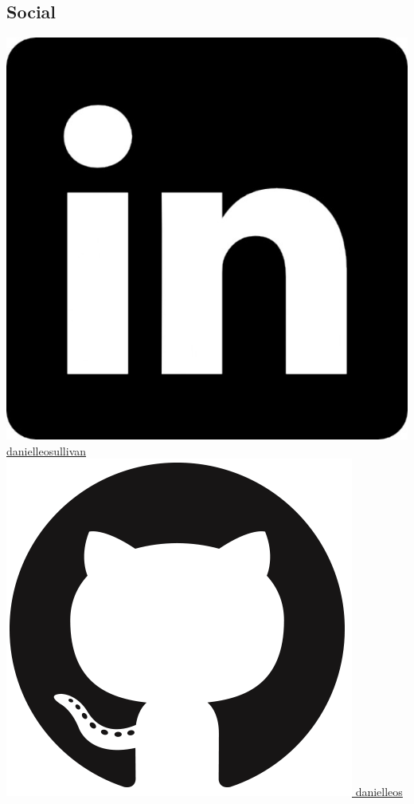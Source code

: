 \documentclass[]{friggeri-cv}
\begin{document}
\begin{aside}
  \section{Social}
    \href{https://www.linkedin.com/in/danielleosullivan}{\includegraphics[scale=0.015]{img/linkedin.jpg} danielleosullivan}
    \href{https://github.com/danielleos}{\includegraphics[scale=0.025]{img/github.png} danielleos}
    ~

\end{aside}
\end{document}
